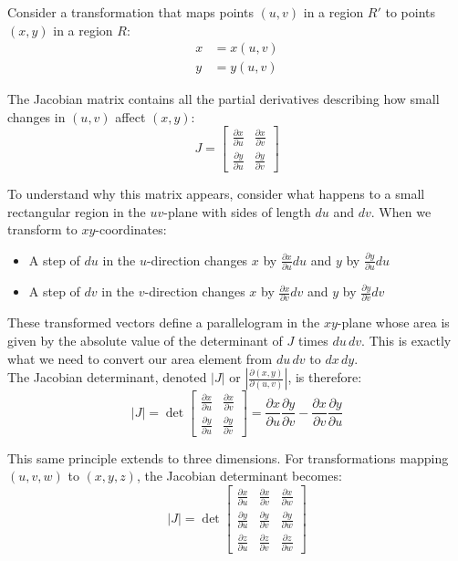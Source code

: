\noindent Consider a transformation that maps points $(u,v)$ in a region $R'$ to points $(x,y)$ in a region $R$:
\begin{align*}
x &= x(u,v) \\
y &= y(u,v)
\end{align*}

\noindent The Jacobian matrix contains all the partial derivatives describing how small changes in $(u,v)$ affect $(x,y)$:
\[
J = \begin{bmatrix}
\frac{\partial x}{\partial u} & \frac{\partial x}{\partial v} \\[1ex]
\frac{\partial y}{\partial u} & \frac{\partial y}{\partial v}
\end{bmatrix}
\]

\noindent To understand why this matrix appears, consider what happens to a small rectangular region in the $uv$-plane with sides of length $du$ and $dv$. When we transform to $xy$-coordinates:
\begin{itemize}
   \item A step of $du$ in the $u$-direction changes $x$ by $\frac{\partial x}{\partial u}du$ and $y$ by $\frac{\partial y}{\partial u}du$
   \item A step of $dv$ in the $v$-direction changes $x$ by $\frac{\partial x}{\partial v}dv$ and $y$ by $\frac{\partial y}{\partial v}dv$
\end{itemize}

\noindent These transformed vectors define a parallelogram in the $xy$-plane whose area is given by the absolute value of the determinant of $J$ times $du\,dv$. This is exactly what we need to convert our area element from $du\,dv$ to $dx\,dy$. \\

\noindent The Jacobian determinant, denoted $|J|$ or $\left|\frac{\partial(x,y)}{\partial(u,v)}\right|$, is therefore:
\[
|J| = \det\begin{bmatrix}
\frac{\partial x}{\partial u} & \frac{\partial x}{\partial v} \\[1ex]
\frac{\partial y}{\partial u} & \frac{\partial y}{\partial v}
\end{bmatrix} = \frac{\partial x}{\partial u}\frac{\partial y}{\partial v} - \frac{\partial x}{\partial v}\frac{\partial y}{\partial u}
\]

\noindent This same principle extends to three dimensions. For transformations mapping $(u,v,w)$ to $(x,y,z)$, the Jacobian determinant becomes:
\[
|J| = \det\begin{bmatrix}
\frac{\partial x}{\partial u} & \frac{\partial x}{\partial v} & \frac{\partial x}{\partial w} \\[1ex]
\frac{\partial y}{\partial u} & \frac{\partial y}{\partial v} & \frac{\partial y}{\partial w} \\[1ex]
\frac{\partial z}{\partial u} & \frac{\partial z}{\partial v} & \frac{\partial z}{\partial w}
\end{bmatrix}
\]

